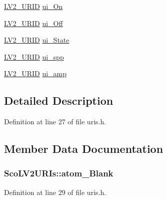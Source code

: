 \begin{DoxyCompactItemize}
\item 
\hyperlink{urid_8h_a5ff0630d245539e9f6dca10ff3c40fae}{L\+V2\+\_\+\+U\+R\+ID} \hyperlink{struct_sco_l_v2_u_r_is_aa44cdd11ea78323f2d4eeb6924f28985}{ui\+\_\+\+On}
\item 
\hyperlink{urid_8h_a5ff0630d245539e9f6dca10ff3c40fae}{L\+V2\+\_\+\+U\+R\+ID} \hyperlink{struct_sco_l_v2_u_r_is_ac894b76735a035f6e83c7746034a46f1}{ui\+\_\+\+Off}
\item 
\hyperlink{urid_8h_a5ff0630d245539e9f6dca10ff3c40fae}{L\+V2\+\_\+\+U\+R\+ID} \hyperlink{struct_sco_l_v2_u_r_is_a73b1f22ab52b9cde25e37b430e8366c9}{ui\+\_\+\+State}
\item 
\hyperlink{urid_8h_a5ff0630d245539e9f6dca10ff3c40fae}{L\+V2\+\_\+\+U\+R\+ID} \hyperlink{struct_sco_l_v2_u_r_is_adeb47c8ab544f006f7e5fcb7275d4cbc}{ui\+\_\+spp}
\item 
\hyperlink{urid_8h_a5ff0630d245539e9f6dca10ff3c40fae}{L\+V2\+\_\+\+U\+R\+ID} \hyperlink{struct_sco_l_v2_u_r_is_a4a9edb0ff3c1adb4da313a845574a04f}{ui\+\_\+amp}
\end{DoxyCompactItemize}


\subsection{Detailed Description}


Definition at line 27 of file uris.\+h.



\subsection{Member Data Documentation}
\subsubsection[{\texorpdfstring{atom\+\_\+\+Blank}{atom_Blank}}]{ Sco\+L\+V2\+U\+R\+Is\+::atom\+\_\+\+Blank}\hypertarget{struct_sco_l_v2_u_r_is_a29ecb9082898099bbc59fcb7590bea7a}{}\label{struct_sco_l_v2_u_r_is_a29ecb9082898099bbc59fcb7590bea7a}


Definition at line 29 of file uris.\+h.

